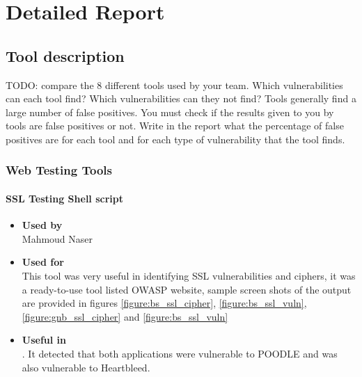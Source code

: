 \chapter{Detailed Report}\label{chapter:detailed_report}

\section{Tool description}

TODO:\newline
compare the 8 different tools used by your team. Which vulnerabilities can each
tool find? Which vulnerabilities can they not find?\newline
Tools generally find a large number of false positives. You must check if the results given to you by tools
are false positives or not. Write in the report what the percentage of false positives are for each tool and
for each type of vulnerability that the tool finds.

\subsection*{Web Testing Tools}

\subsubsection*{SSL Testing Shell script}
\begin{itemize}
	\item \textbf{Used by}\\ Mahmoud Naser
	\item \textbf{Used for}\\
	This tool was very useful in identifying SSL vulnerabilities and ciphers, it was a ready-to-use tool listed OWASP website, sample screen shots of the output are provided in figures \autoref{figure:bs_ssl_cipher}, \autoref{figure:bs_ssl_vuln}, \autoref{figure:gnb_ssl_cipher} and \autoref{figure:bs_ssl_vuln} 
	\item \textbf{Useful in}\\ .
	It detected that both applications were vulnerable to POODLE and \bs was also vulnerable to Heartbleed.
\end{itemize}

